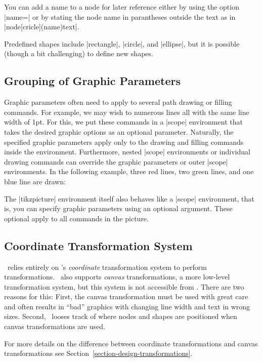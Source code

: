 You can add a name to a node for later reference either by using the
option   |name=| or by stating the node name in
parantheses outside the text as in |node[cricle](name){text}|.

Predefined shapes include |rectangle|, |circle|, and |ellipse|, but
it is possible (though a bit challenging) to define new shapes.

\subsection{Grouping of Graphic Parameters}

Graphic parameters often need to apply to several path drawing or
filling commands. For example, we may wish to numerous lines all
with the same line width of 1pt. For this, we put these commands
in a |{scope}| environment that takes the desired graphic options
as an optional parameter. Naturally, the specified graphic
parameters apply only to the drawing and filling commands inside the
environment. Furthermore, nested |{scope}| environments or
individual drawing commands can override the graphic parameters or
outer |{scope}| environments. In the following example, three red
lines, two green lines, and one blue line are drawn:

\begin{codeexample}[]
\begin{tikzpicture}
  \begin{scope}[color=red]
    \draw (0mm,10mm) -- (10mm,10mm);
    \draw (0mm, 8mm) -- (10mm, 8mm);
    \draw (0mm, 6mm) -- (10mm, 6mm);
  \end{scope}
  \begin{scope}[color=green]
    \draw (0mm, 4mm) -- (10mm, 4mm);
    \draw (0mm, 2mm) -- (10mm, 2mm);
    \draw[color=blue]
          (0mm, 0mm) -- (10mm, 0mm);
  \end{scope}
\end{tikzpicture}
\end{codeexample}

The |{tikzpicture}| environment itself also behaves like a
|{scope}| environment, that is, you can specify graphic parameters
using an optional argument. These optional apply to all commands in
the picture.


\subsection{Coordinate Transformation System}

\tikzname\ relies entirely on \pgfname's \emph{coordinate} transformation
system to perform transformations. \pgfname\ also supports
\emph{canvas} transformations, a more low-level transformation system,
but this system is not accessible from \tikzname. There are two reasons
for this: First, the canvas transformation must be used with great
care and often results in ``bad'' graphics with changing line width
and text in wrong sizes. Second, \pgfname\ looses track of where nodes
and shapes are positioned when canvas transformations are used.

For more details on the difference between coordinate transformations
and canvas transformations see
Section~\ref{section-design-transformations}. 
